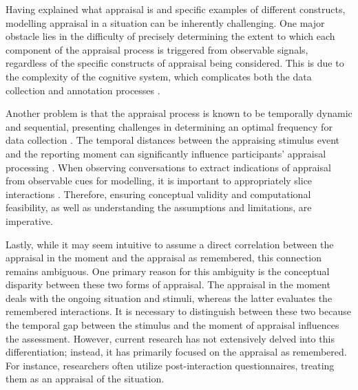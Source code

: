 
Having explained what appraisal is and specific examples of different constructs, modelling appraisal in a situation can be inherently challenging. One major obstacle lies in the difficulty of precisely determining the extent to which each component of the appraisal process is triggered from observable signals, regardless of the specific constructs of appraisal being considered. This is due to the complexity of the cognitive system, which complicates both the data collection and annotation processes \cite{sander2005systems}.


Another problem is that the appraisal process is known to be temporally dynamic and sequential, presenting challenges in determining an optimal frequency for data collection \cite{tekoppele2023we}. The temporal distances between the appraising stimulus event and the reporting moment can significantly influence participants' appraisal processing \cite{dudzik2023valid}. When observing conversations to extract indications of appraisal from observable cues for modelling, it is important to appropriately slice interactions \cite{murphy2021capturing}. Therefore, ensuring conceptual validity and computational feasibility, as well as understanding the assumptions and limitations, are imperative.

Lastly, while it may seem intuitive to assume a direct correlation between the appraisal in the moment and the appraisal as remembered, this connection remains ambiguous. One primary reason for this ambiguity is the conceptual disparity between these two forms of appraisal. The appraisal in the moment deals with the ongoing situation and stimuli, whereas the latter evaluates the remembered interactions. It is necessary to distinguish between these two because the temporal gap between the stimulus and the moment of appraisal influences the assessment\cite{trope2003temporal}. However, current research has not extensively delved into this differentiation; instead, it has primarily focused on the appraisal as remembered. For instance, researchers often utilize post-interaction questionnaires, treating them as an appraisal of the situation.

